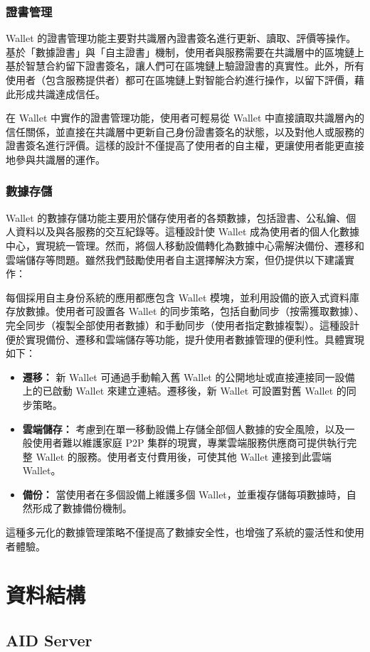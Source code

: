 \subsubsection{證書管理}
Wallet 的證書管理功能主要對共識層內證書簽名進行更新、讀取、評價等操作。基於「數據證書」與「自主證書」機制，使用者與服務需要在共識層中的區塊鏈上基於智慧合約留下證書簽名，讓人們可在區塊鏈上驗證證書的真實性。此外，所有使用者（包含服務提供者）都可在區塊鏈上對智能合約進行操作，以留下評價，藉此形成共識達成信任。

在 Wallet 中實作的證書管理功能，使用者可輕易從 Wallet 中直接讀取共識層內的信任關係，並直接在共識層中更新自己身份證書簽名的狀態，以及對他人或服務的證書簽名進行評價。這樣的設計不僅提高了使用者的自主權，更讓使用者能更直接地參與共識層的運作。
\subsubsection{數據存儲}
Wallet 的數據存儲功能主要用於儲存使用者的各類數據，包括證書、公私鑰、個人資料以及與各服務的交互紀錄等。這種設計使 Wallet 成為使用者的個人化數據中心，實現統一管理。然而，將個人移動設備轉化為數據中心需解決備份、遷移和雲端儲存等問題。雖然我們鼓勵使用者自主選擇解決方案，但仍提供以下建議實作：

每個採用自主身份系統的應用都應包含 Wallet 模塊，並利用設備的嵌入式資料庫存放數據。使用者可設置各 Wallet 的同步策略，包括自動同步（按需獲取數據）、完全同步（複製全部使用者數據）和手動同步（使用者指定數據複製）。這種設計便於實現備份、遷移和雲端儲存等功能，提升使用者數據管理的便利性。具體實現如下：
\begin{itemize}
  \item \textbf{遷移：} 新 Wallet 可通過手動輸入舊 Wallet 的公開地址或直接連接同一設備上的已啟動 Wallet 來建立連結。遷移後，新 Wallet 可設置對舊 Wallet 的同步策略。
  \item \textbf{雲端儲存：} 考慮到在單一移動設備上存儲全部個人數據的安全風險，以及一般使用者難以維護家庭 P2P 集群的現實，專業雲端服務供應商可提供執行完整 Wallet 的服務。使用者支付費用後，可使其他 Wallet 連接到此雲端 Wallet。
  \item \textbf{備份：} 當使用者在多個設備上維護多個 Wallet，並重複存儲每項數據時，自然形成了數據備份機制。
\end{itemize}
這種多元化的數據管理策略不僅提高了數據安全性，也增強了系統的靈活性和使用者體驗。
\section{資料結構}
\subsection{AID Server}
